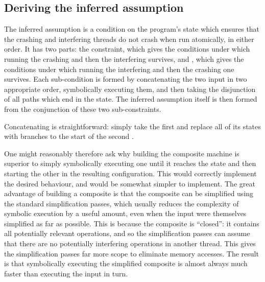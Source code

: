 \subsection{Deriving the inferred assumption}

The inferred assumption is a condition on the program's state which
ensures that the crashing and interfering threads do not crash when
run atomically, in either order.  It has two parts: the
 constraint, which gives the conditions under
which running the crashing {\StateMachine} and then the interfering
{\StateMachine} survives, and , which gives
the conditions under which running the interfering {\StateMachine} and
then the crashing one survives.  Each sub-condition is formed by
concatenating the two input {\StateMachines} in two appropriate order,
symbolically executing them, and then taking the disjunction of all
paths which end in the  state.  The inferred assumption itself is
then formed from the conjunction of these two sub-constraints.

Concatenating {\StateMachines} is straightforward: simply take the
first {\StateMachine} and replace all of its  states
with branches to the start of the second {\StateMachine}.

One might reasonably therefore ask why building the composite machine
is superior to simply symbolically executing one {\StateMachine} until
it reaches the  state and then starting the other
{\StateMachine} in the resulting configuration.  This would correctly
implement the desired behaviour, and would be somewhat simpler to
implement.  The great advantage of building a composite
{\StateMachine} is that the composite {\StateMachine} can be
simplified using the standard {\StateMachine} simplification passes,
which usually reduces the complexity of symbolic execution by a useful
amount, even when the input {\StateMachines} were themselves
simplified as far as possible.  This is because the composite
{\StateMachine} is ``closed'': it contains all potentially relevant
operations, and so the simplification passes can assume that there are
no potentially interfering operations in another thread.  This gives
the simplification passes far more scope to eliminate memory accesses.
The result is that symbolically executing the simplified composite
{\StateMachine} is almost always much faster than executing the input
{\StateMachines} in turn.

